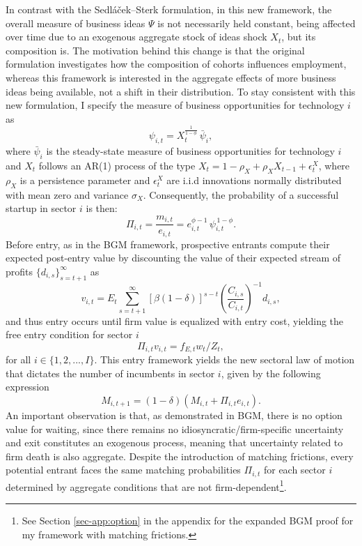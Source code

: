 \documentclass[a4paper,12pt]{article} %
\numberwithin{equation}{section} %
\numberwithin{figure}{section}
\numberwithin{table}{section}
\begin{document}
In contrast with the Sedláček–Sterk formulation, in this new framework, the overall measure of business ideas \(\Psi\) is not necessarily held constant,
being affected over time due to an exogenous aggregate stock of ideas shock \(X_t\), but its composition is. The motivation behind this change is that
the original formulation investigates how the composition of cohorts influences employment, whereas this framework is interested in the aggregate 
effects of more business ideas being available, not a shift in their distribution. To stay consistent with this new formulation, I specify the measure 
of business opportunities for technology \(i\) as 
\begin{equation}
  \psi_{i,t} =X_t^{\frac{1}{1-\phi}}\,\bar{\psi}_i, \label{eq:psilaw}
\end{equation}
where \(\bar{\psi}_i\) is the steady-state measure of business opportunities for technology \(i\) and $X_t$ follows an AR(1) process of the type 
$X_t = 1 - \rho_X + \rho_X X_{t-1} + \epsilon^X_t$, where $\rho_X$ is a persistence parameter and $\epsilon^X_t$ are i.i.d innovations 
normally distributed with mean zero and variance $\sigma_X$. Consequently, the probability of a successful startup in sector $i$ is then:
\begin{equation}
  \Pi_{i,t} = \frac{m_{i,t}}{e_{i,t}} = e_{i,t}^{\phi-1}\,\psi_{i,t}^{\,1-\phi}. \label{eq:probability}
\end{equation}
Before entry, as in the BGM framework, prospective entrants compute their expected post-entry value by discounting the value of their expected stream
of profits $\{d_{i,s}\}_{s=t+1}^\infty$ as
\begin{equation}
  v_{i,t} = E_t \sum_{s = t+1}^{\infty} \left[ \beta (1 - \delta) \right]^{s - t} \left( \frac{C_{i,s}}{C_{i,t}} \right)^{-1} d_{i,s}, \label{eq:value}
\end{equation}
and thus entry occurs until firm value is equalized with entry cost, yielding the free entry condition for sector $i$ 
\begin{equation}
  \Pi_{i,t}v_{i,t} = f_{E,t}w_t/Z_t , \label{eq:freeentry}
\end{equation}
for all $i \in \{1,2,..., I\}$. This entry framework yields the new sectoral law of motion that dictates the number of incumbents in sector $i$, 
given by the following expression
\begin{equation}
  M_{i,t+1} = (1-\delta)(M_{i,t} + \Pi_{i,t}e_{i,t}). \label{eq:entrants}
\end{equation}
An important observation is that, as demonstrated in BGM, there is no option value for waiting, since there remains no 
idiosyncratic/firm-specific uncertainty and exit constitutes an exogenous process, meaning that uncertainty related to firm death is also aggregate. 
Despite the introduction of matching frictions, every potential entrant faces the same matching probabilities $\Pi_{i,t}$ for each sector $i$ 
determined by aggregate conditions that are not firm-dependent\footnote{See Section \ref{sec-app:option} in the appendix for the expanded BGM 
proof for my framework with matching frictions.}.
\end{document}
